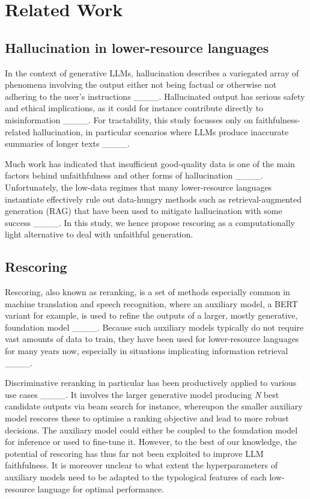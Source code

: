 \section{Related Work}
\subsection{Hallucination in lower-resource languages}
In the context of generative LLMs, hallucination describes a variegated array of phenomena involving the output either not being factual or otherwise not adhering to the user's instructions ____. Hallucinated output has serious safety and ethical implications, as it could for instance contribute directly to misinformation ____. For tractability, this study focusses only on faithfulness-related hallucination, in particular scenarios where LLMs produce inaccurate summaries of longer texts ____.

Much work has indicated that insufficient good-quality data is one of the main factors behind unfaithfulness and other forms of hallucination ____. Unfortunately, the low-data regimes that many lower-resource languages instantiate effectively rule out data-hungry methods such as retrieval-augmented generation (RAG) that have been used to mitigate hallucination with some success ____. In this study, we hence propose rescoring as a computationally light alternative to deal with unfaithful generation.

\subsection{Rescoring}
\label{sec:rescoring}
Rescoring, also known as reranking, is a set of methods especially common in machine translation and speech recognition, where an auxiliary model, a BERT variant for example, is used to refine the outputs of a larger, mostly generative, foundation model ____. Because such auxiliary models typically do not require vast amounts of data to train, they have been used for lower-resource languages for many years now, especially in situations implicating information retrieval ____. 

Discriminative reranking in particular has been productively applied to various use cases ____. It involves the larger generative model producing \textit{N} best candidate outputs via beam search for instance, whereupon the smaller auxiliary model rescores these to optimise a ranking objective and lead to more robust decisions. The auxiliary model could either be coupled to the foundation model for inference or used to fine-tune it. However, to the best of our knowledge, the potential of rescoring has thus far not been exploited to improve LLM faithfulness. It is moreover unclear to what extent the hyperparameters of auxiliary models need to be adapted to the typological features of each low-resource language for optimal performance.

